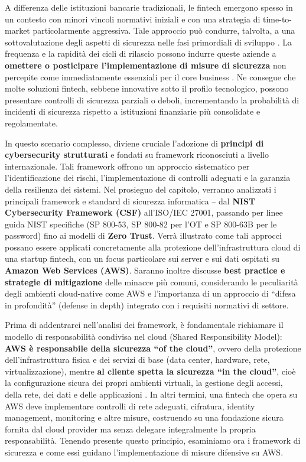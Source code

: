 A differenza delle istituzioni bancarie tradizionali, le fintech emergono spesso in un contesto con minori vincoli normativi iniziali e con una strategia di time-to-market particolarmente aggressiva. Tale approccio può condurre, talvolta, a una sottovalutazione degli aspetti di sicurezza nelle fasi primordiali di sviluppo \cite{netguru2023}. La frequenza e la rapidità dei cicli di rilascio possono indurre queste aziende a \textbf{omettere o posticipare l'implementazione di misure di sicurezza} non percepite come immediatamente essenziali per il core business \cite{netguru2023}. Ne consegue che molte soluzioni fintech, sebbene innovative sotto il profilo tecnologico, possono presentare controlli di sicurezza parziali o deboli, incrementando la probabilità di incidenti di sicurezza rispetto a istituzioni finanziarie più consolidate e regolamentate.

In questo scenario complesso, diviene cruciale l'adozione di \textbf{principi di cybersecurity strutturati} e fondati su framework riconosciuti a livello internazionale. Tali framework offrono un approccio sistematico per l'identificazione dei rischi, l'implementazione di controlli adeguati e la garanzia della resilienza dei sistemi. Nel prosieguo del capitolo, verranno analizzati i principali framework e standard di sicurezza informatica – dal \textbf{NIST Cybersecurity Framework (CSF)} all'ISO/IEC 27001, passando per linee guida NIST specifiche (SP 800-53, SP 800-82 per l'OT e SP 800-63B per le password) fino ai modelli di \textbf{Zero Trust}. Verrà illustrato come tali approcci possano essere applicati concretamente alla protezione dell'infrastruttura cloud di una startup fintech, con un focus particolare sui server e sui dati ospitati su \textbf{Amazon Web Services (AWS)}. Saranno inoltre discusse \textbf{best practice e strategie di mitigazione} delle minacce più comuni, considerando le peculiarità degli ambienti cloud-native come AWS e l'importanza di un approccio di \enquote{difesa in profondità} (defense in depth) integrato con i requisiti normativi di settore.

Prima di addentrarci nell'analisi dei framework, è fondamentale richiamare il modello di responsabilità condivisa nel cloud (Shared Responsibility Model): \textbf{AWS è responsabile della sicurezza \enquote{of the cloud}}, ovvero della protezione dell'infrastruttura fisica e dei servizi di base (data center, hardware, rete, virtualizzazione), mentre \textbf{al cliente spetta la sicurezza \enquote{in the cloud}}, cioè la configurazione sicura dei propri ambienti virtuali, la gestione degli accessi, della rete, dei dati e delle applicazioni \cite{awsResponsibility}. In altri termini, una fintech che opera su AWS deve implementare controlli di rete adeguati, cifratura, identity management, monitoring e altre misure, costruendo su una fondazione sicura fornita dal cloud provider ma senza delegare integralmente la propria responsabilità. Tenendo presente questo principio, esaminiamo ora i framework di sicurezza e come essi guidano l'implementazione di misure difensive su AWS.


